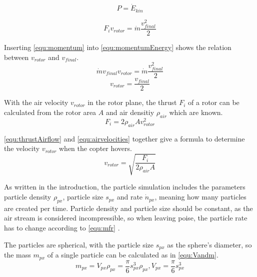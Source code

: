     \begin{equation}
    P = \dot E_{kin}
    \label{equ:consE}
    \end{equation}
    
    \begin{equation}
    F_i v_{rotor} = \dot m \frac{v_{final}^2}{2}
    \label{equ:momentumEnergy}
    \end{equation}
    
    Inserting \ref{equ:momentum} into \ref{equ:momentumEnergy} shows the relation between $v_{rotor}$ and $v_{final}$.
    \begin{equation}
    \dot m v_{final}  v_{rotor} = \dot m \frac{v_{final}^2}{2}
    \end{equation}
    \begin{equation}
     v_{rotor} = \frac{v_{final}}{2}
     \label{equ:airvelocities}
    \end{equation}
    
    With the air velocity $v_{rotor}$ in the rotor plane, the thrust $F_i$ of a rotor can be calculated from the rotor area $A$ and air densitiy $\rho_{air}$ which are known.
    \begin{equation}
    F_i = 2 \rho_{air} A v_{rotor}^2
    \label{equ:thrustAirflow}
    \end{equation}
    
    \ref{equ:thrustAirflow} and \ref{equ:airvelocities} together give a formula to determine the  velocity $v_{rotor}$  when the copter hovers.
    \begin{equation}
    v_{rotor}= \sqrt{\frac{ F_i}{2 \rho_{air} A}}
    \end{equation}
    
    As written in the introduction, the particle simulation includes the parameters particle density $\rho_{px}$, particle size $s_{px}$ and rate $\dot n_{px}$, meaning how many particles are created per time. 
    Particle density and particle size should be constant, as the air stream is considered incompressible, so when leaving poise, the particle rate has to change according to \ref{equ:mfr} \cite{deeg2006modeling}.
    
    The particles are spherical, with the particle size $s_{px}$ as the sphere's diameter, so the mass $m_{px}$ of a single particle can be calculated as in \ref{equ:Vandm}.
    \begin{equation}
    m_{px} = V_{px}  \rho_{px}  =  \frac{\pi}{6}s_{px}^3  \rho_{px},  V_{px}  = \frac{\pi}{6}s_{px}^3
    \label{equ:Vandm}
    \end{equation}
    
